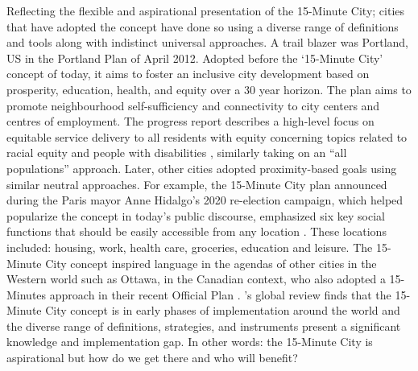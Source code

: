 \documentclass[
  authoryear,
  preprint,
  3p]{elsarticle}
\begin{document}
Reflecting the flexible and aspirational presentation of the 15-Minute
City; cities that have adopted the concept have done so using a diverse
range of definitions and tools along with indistinct universal
approaches. A trail blazer was Portland, US in the Portland Plan
\citep{city_of_portland_20minute_2010} of April 2012. Adopted before the
`15-Minute City' concept of today, it aims to foster an inclusive city
development based on prosperity, education, health, and equity over a 30
year horizon. The plan aims to promote neighbourhood self-sufficiency
and connectivity to city centers and centres of employment. The progress
report describes a high-level focus on equitable service delivery to all
residents with equity concerning topics related to racial equity and
people with disabilities \citep{portland_government_portland_2017},
similarly taking on an ``all populations'' approach. Later, other cities
adopted proximity-based goals using similar neutral approaches. For
example, the 15-Minute City plan announced during the Paris mayor Anne
Hidalgo's 2020 re-election campaign, which helped popularize the concept
in today's public discourse, emphasized six key social functions that
should be easily accessible from any location
\citep{ville_de_paris_paris_2022}. These locations included: housing,
work, health care, groceries, education and leisure. The 15-Minute City
concept inspired language in the agendas of other cities in the Western
world such as Ottawa, in the Canadian context, who also adopted a
15-Minutes approach in their recent Official Plan
\citep{ville_dottawa_quartier_2021}.
\citet{teixeiraClassifying15minuteCities2024}'s global review finds that
the 15-Minute City concept is in early phases of implementation around
the world and the diverse range of definitions, strategies, and
instruments present a significant knowledge and implementation gap. In
other words: the 15-Minute City is aspirational but how do we get there
and who will benefit?
\end{document}
